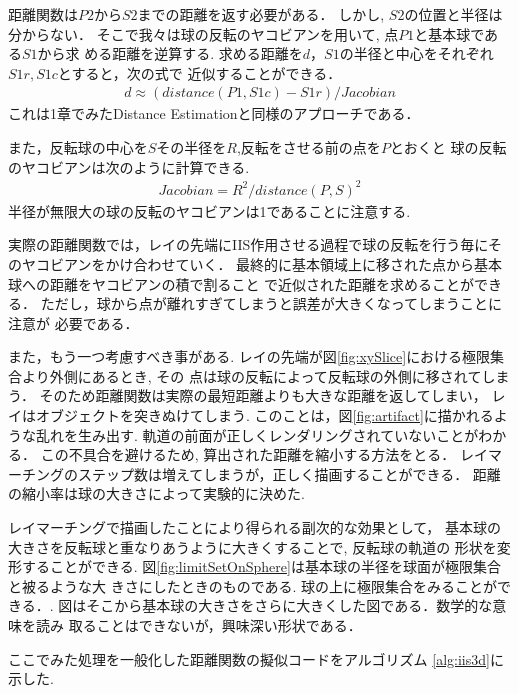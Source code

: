 距離関数は$P2$から$S2$までの距離を返す必要がある．
しかし, $S2$の位置と半径は分からない．
そこで我々は球の反転のヤコビアンを用いて, 点$P1$と基本球である$S1$から求
める距離を逆算する.
求める距離を$d$，$S1$の半径と中心をそれぞれ$S1r, S1c$とすると，次の式で
近似することができる．
\begin{align*}
 d \approx (distance(P1, S1c) - S1r) / Jacobian
\end{align*}
これは1章でみたDistance Estimationと同様のアプローチである．

また，反転球の中心を$S$その半径を$R$,反転をさせる前の点を$P$とおくと
球の反転のヤコビアンは次のように計算できる.
\begin{align*}
 Jacobian = R^2 / distance(P, S)^2 
\end{align*}
半径が無限大の球の反転のヤコビアンは1であることに注意する.

実際の距離関数では，レイの先端にIIS作用させる過程で球の反転を行う毎にそ
のヤコビアンをかけ合わせていく．
最終的に基本領域上に移された点から基本球への距離をヤコビアンの積で割ること
で近似された距離を求めることができる．
ただし，球から点が離れすぎてしまうと誤差が大きくなってしまうことに注意が
必要である．

また，もう一つ考慮すべき事がある.
レイの先端が図\ref{fig:xySlice}における極限集合より外側にあるとき, その
点は球の反転によって反転球の外側に移されてしまう．
そのため距離関数は実際の最短距離よりも大きな距離を返してしまい，
レイはオブジェクトを突きぬけてしまう.
このことは，図\ref{fig:artifact}に描かれるような乱れを生み出す.
軌道の前面が正しくレンダリングされていないことがわかる．
この不具合を避けるため, 算出された距離を縮小する方法をとる．
レイマーチングのステップ数は増えてしまうが，正しく描画することができる．
距離の縮小率は球の大きさによって実験的に決めた.

レイマーチングで描画したことにより得られる副次的な効果として，
基本球の大きさを反転球と重なりあうように大きくすることで, 反転球の軌道の
形状を変形することができる.
図\ref{fig:limitSetOnSphere}は基本球の半径を球面が極限集合と被るような大
きさにしたときのものである.
球の上に極限集合をみることができる．.
図はそこから基本球の大きさをさらに大きくした図である．数学的な意味を読み
取ることはできないが，興味深い形状である．

ここでみた処理を一般化した距離関数の擬似コードをアルゴリズム
\ref{alg:iis3d}に示した.

